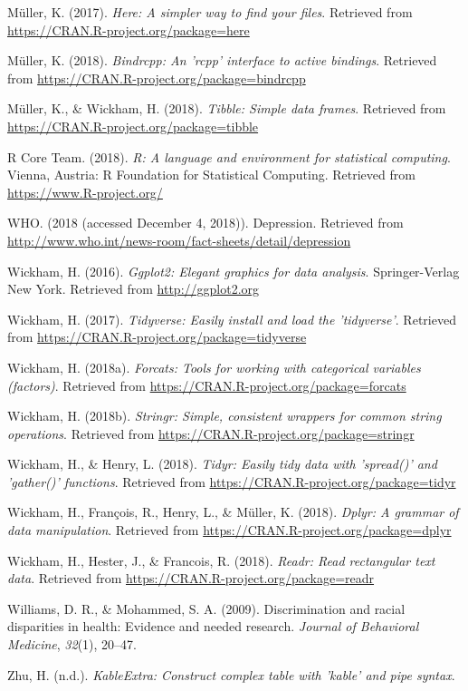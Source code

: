 \documentclass[man]{apa6}
\begin{document}
\hypertarget{ref-R-here}{}
Müller, K. (2017). \emph{Here: A simpler way to find your files}.
Retrieved from \url{https://CRAN.R-project.org/package=here}

\hypertarget{ref-R-bindrcpp}{}
Müller, K. (2018). \emph{Bindrcpp: An 'rcpp' interface to active
bindings}. Retrieved from
\url{https://CRAN.R-project.org/package=bindrcpp}

\hypertarget{ref-R-tibble}{}
Müller, K., \& Wickham, H. (2018). \emph{Tibble: Simple data frames}.
Retrieved from \url{https://CRAN.R-project.org/package=tibble}

\hypertarget{ref-R-base}{}
R Core Team. (2018). \emph{R: A language and environment for statistical
computing}. Vienna, Austria: R Foundation for Statistical Computing.
Retrieved from \url{https://www.R-project.org/}

\hypertarget{ref-who}{}
WHO. (2018 (accessed December 4, 2018)). Depression. Retrieved from
\url{http://www.who.int/news-room/fact-sheets/detail/depression}

\hypertarget{ref-R-ggplot2}{}
Wickham, H. (2016). \emph{Ggplot2: Elegant graphics for data analysis}.
Springer-Verlag New York. Retrieved from \url{http://ggplot2.org}

\hypertarget{ref-R-tidyverse}{}
Wickham, H. (2017). \emph{Tidyverse: Easily install and load the
'tidyverse'}. Retrieved from
\url{https://CRAN.R-project.org/package=tidyverse}

\hypertarget{ref-R-forcats}{}
Wickham, H. (2018a). \emph{Forcats: Tools for working with categorical
variables (factors)}. Retrieved from
\url{https://CRAN.R-project.org/package=forcats}

\hypertarget{ref-R-stringr}{}
Wickham, H. (2018b). \emph{Stringr: Simple, consistent wrappers for
common string operations}. Retrieved from
\url{https://CRAN.R-project.org/package=stringr}

\hypertarget{ref-R-tidyr}{}
Wickham, H., \& Henry, L. (2018). \emph{Tidyr: Easily tidy data with
'spread()' and 'gather()' functions}. Retrieved from
\url{https://CRAN.R-project.org/package=tidyr}

\hypertarget{ref-R-dplyr}{}
Wickham, H., François, R., Henry, L., \& Müller, K. (2018). \emph{Dplyr:
A grammar of data manipulation}. Retrieved from
\url{https://CRAN.R-project.org/package=dplyr}

\hypertarget{ref-R-readr}{}
Wickham, H., Hester, J., \& Francois, R. (2018). \emph{Readr: Read
rectangular text data}. Retrieved from
\url{https://CRAN.R-project.org/package=readr}

\hypertarget{ref-williams2009discrimination}{}
Williams, D. R., \& Mohammed, S. A. (2009). Discrimination and racial
disparities in health: Evidence and needed research. \emph{Journal of
Behavioral Medicine}, \emph{32}(1), 20--47.

\hypertarget{ref-R-kableExtra}{}
Zhu, H. (n.d.). \emph{KableExtra: Construct complex table with 'kable'
and pipe syntax}.

\endgroup
\end{document}
